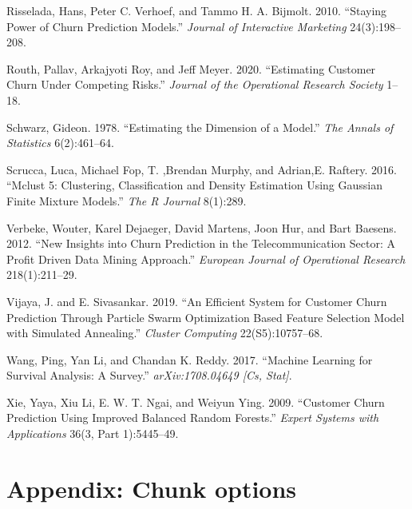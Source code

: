 \documentclass[
  12pt,
]{article}
\newlength{\cslhangindent}
\newlength{\cslentryspacingunit} %
\newenvironment{CSLReferences}[2] %
 {%
  \setlength{\parindent}{0pt}
  \ifodd #1
  \let\oldpar\par
  \def\par{\hangindent=\cslhangindent\oldpar}
  \fi
  \setlength{\parskip}{#2\cslentryspacingunit}
 }%
 {}
\begin{document}
\begin{CSLReferences}{1}{0}
\leavevmode{}%
Risselada, Hans, Peter C. Verhoef, and Tammo H. A. Bijmolt. 2010. {``Staying {Power} of {Churn} {Prediction} {Models}.''} \emph{Journal of Interactive Marketing} 24(3):198--208.

\leavevmode{}%
Routh, Pallav, Arkajyoti Roy, and Jeff Meyer. 2020. {``Estimating Customer Churn Under Competing Risks.''} \emph{Journal of the Operational Research Society} 1--18.

\leavevmode{}%
Schwarz, Gideon. 1978. {``Estimating the Dimension of a Model.''} \emph{The Annals of Statistics} 6(2):461--64.

\leavevmode{}%
Scrucca, Luca, Michael Fop, T. ,Brendan Murphy, and Adrian,E. Raftery. 2016. {``Mclust 5: Clustering, Classification and Density Estimation Using Gaussian Finite Mixture Models.''} \emph{The R Journal} 8(1):289.

\leavevmode{}%
Verbeke, Wouter, Karel Dejaeger, David Martens, Joon Hur, and Bart Baesens. 2012. {``New Insights into Churn Prediction in the Telecommunication Sector: {A} Profit Driven Data Mining Approach.''} \emph{European Journal of Operational Research} 218(1):211--29.

\leavevmode{}%
Vijaya, J. and E. Sivasankar. 2019. {``An Efficient System for Customer Churn Prediction Through Particle Swarm Optimization Based Feature Selection Model with Simulated Annealing.''} \emph{Cluster Computing} 22(S5):10757--68.

\leavevmode{}%
Wang, Ping, Yan Li, and Chandan K. Reddy. 2017. {``Machine Learning for Survival Analysis: A Survey.''} \emph{arXiv:1708.04649 {[}Cs, Stat{]}}.

\leavevmode{}%
Xie, Yaya, Xiu Li, E. W. T. Ngai, and Weiyun Ying. 2009. {``Customer Churn Prediction Using Improved Balanced Random Forests.''} \emph{Expert Systems with Applications} 36(3, Part 1):5445--49.

\end{CSLReferences}

\hypertarget{appendix-chunk-options}{%
\section*{Appendix: Chunk options}\label{appendix-chunk-options}}
\end{document}
